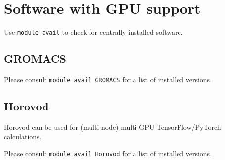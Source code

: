 




\section{Software with GPU support}
\label{sec:gpu_ugent_software}

Use \lstinline|module avail| to check for centrally installed software.





\subsection{GROMACS}
\label{sec:gpu_ugent_software_gromacs}

Please consult \lstinline|module avail GROMACS| for a list of installed versions.




\subsection{Horovod}
\label{sec:gpu_ugent_software_horovod}

Horovod can be used for (multi-node) multi-GPU TensorFlow/PyTorch calculations.

Please consult \lstinline|module avail Horovod| for a list of installed versions.


